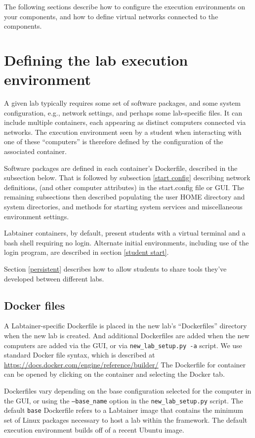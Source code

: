\documentclass[12pt]{article}
\begin{document}
The following sections describe how to configure the execution environments on your components,
and how to define virtual networks connected to the components.

\section {Defining the lab execution environment}
\label{execution environment}
A given lab typically requires some set of software packages, and some
system configuration, e.g., network settings, and perhaps some lab-specific
files.  It can include multiple containers, each appearing as distinct
computers connected via networks.  The execution environment seen by a
student when interacting with one of these ``computers'' is therefore defined
by the configuration of the associated container. 

Software packages are defined in each container's Dockerfile, described in 
the subsection below. That is followed by subsection \ref{start config} describing network definitions,
(and other computer attributes) in the start.config file or GUI.  The remaining subsections then
described populating the user HOME directory and system directories, and methods for starting 
system services and miscellaneous environment settings. 

Labtainer containers, by default, present students with a virtual terminal and a bash
shell requiring no login.  Alternate initial environments, including use of the login program, are
described in section \ref{student start}.

Section \ref{persistent} describes how to
allow students to share tools they've developed between different labs.  

\subsection {Docker files}
A Labtainer-specific Dockerfile is placed in the new lab's ``Dockerfiles'' 
directory when the new lab is created.  And additional Dockerfiles are added when the
new computers are added via the GUI, or via {\tt new\_lab\_setup.py -a} script. 
We use standard Docker file syntax, which is described at 
\url{https://docs.docker.com/engine/reference/builder/}  The Dockerfile for container
can be opened by clicking on the container and selecting the Docker tab.

Dockerfiles vary depending on the base configuration selected for the computer in the GUI,
or using the {\tt --base\_name} option in the {\tt new\_lab\_setup.py} script.
The default {\tt base} Dockerfile refers to a Labtainer
image that contains the minimum set of Linux packages necessary to 
host a lab within the framework.  The default
execution environment builds off of a recent Ubuntu image.
\end{document}
